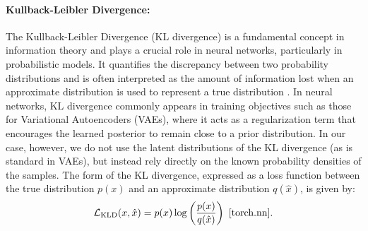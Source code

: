 \paragraph{Kullback-Leibler Divergence:} The Kullback-Leibler Divergence (KL divergence) is a fundamental concept in information theory and plays a crucial role in neural networks, particularly in probabilistic models. It quantifies the discrepancy between two probability distributions and is often interpreted as the amount of information lost when an approximate distribution is used to represent a true distribution \cite{Kingma19}. In neural networks, KL divergence commonly appears in training objectives such as those for Variational Autoencoders (VAEs), where it acts as a regularization term that encourages the learned posterior to remain close to a prior distribution. In our case, however, we do not use the latent distributions of the KL divergence (as is standard in VAEs), but instead rely directly on the known probability densities of the samples. The form of the KL divergence, expressed as a loss function between the true distribution $p(x)$ and an approximate distribution $q(\hat{x})$, is given by:
\[
\mathcal{L}_{\text{KLD}}(x, \hat{x}) = p(x) \log \left( \frac{p(x)}{q(\hat{x})} \right) \ \cite{torch.nn}.
\]

